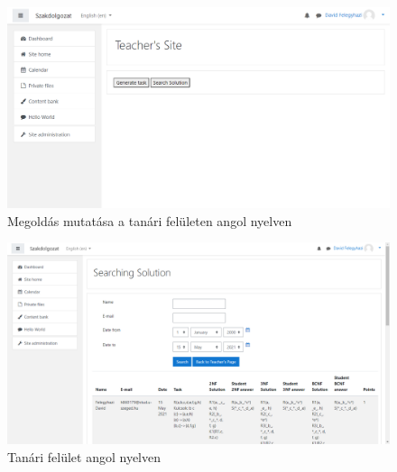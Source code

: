 \begin{figure}
    \centering
    \includegraphics[scale=0.4]{Fejezetek/Images/english04.png}
    \caption{Megoldás mutatása a tanári felületen angol nyelven}
\end{figure}
\begin{figure}
    \centering
    \includegraphics[scale=0.4]{Fejezetek/Images/english05.png}
    \caption{Tanári felület angol nyelven}
\end{figure}